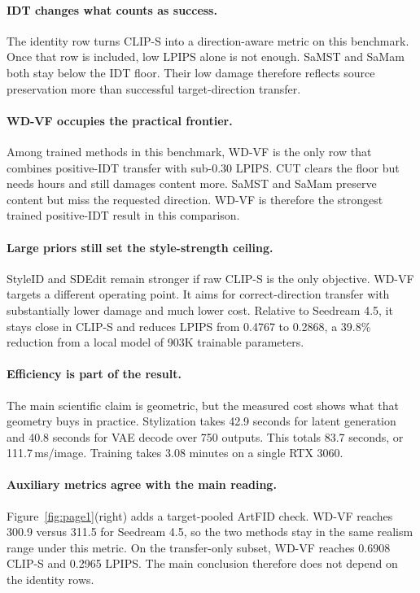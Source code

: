 \documentclass[letterpaper]{article}
\begin{document}
\paragraph{IDT changes what counts as success.}
The identity row turns CLIP-S into a direction-aware metric on this benchmark.
Once that row is included, low LPIPS alone is not enough.
SaMST and SaMam both stay below the IDT floor.
Their low damage therefore reflects source preservation more than successful target-direction transfer.

\paragraph{WD-VF occupies the practical frontier.}
Among trained methods in this benchmark, WD-VF is the only row that combines positive-IDT transfer with sub-0.30 LPIPS.
CUT clears the floor but needs hours and still damages content more.
SaMST and SaMam preserve content but miss the requested direction.
WD-VF is therefore the strongest trained positive-IDT result in this comparison.

\paragraph{Large priors still set the style-strength ceiling.}
StyleID and SDEdit remain stronger if raw CLIP-S is the only objective.
WD-VF targets a different operating point.
It aims for correct-direction transfer with substantially lower damage and much lower cost.
Relative to Seedream 4.5, it stays close in CLIP-S and reduces LPIPS from 0.4767 to 0.2868, a 39.8\% reduction from a local model of 903K trainable parameters.

\paragraph{Efficiency is part of the result.}
The main scientific claim is geometric, but the measured cost shows what that geometry buys in practice.
Stylization takes 42.9 seconds for latent generation and 40.8 seconds for VAE decode over 750 outputs.
This totals 83.7 seconds, or 111.7\,ms/image.
Training takes 3.08 minutes on a single RTX 3060.

\paragraph{Auxiliary metrics agree with the main reading.}
Figure~\ref{fig:page1}(right) adds a target-pooled ArtFID check.
WD-VF reaches 300.9 versus 311.5 for Seedream 4.5, so the two methods stay in the same realism range under this metric.
On the transfer-only subset, WD-VF reaches 0.6908 CLIP-S and 0.2965 LPIPS.
The main conclusion therefore does not depend on the identity rows.
\end{document}

